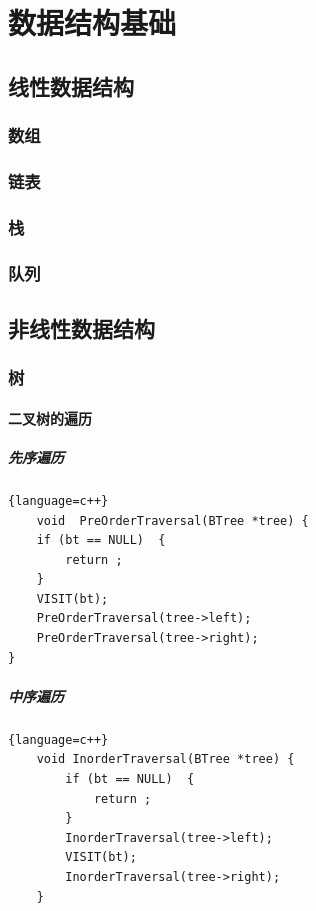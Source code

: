 \chapter{数据结构基础}
\section{线性数据结构}
\subsection{数组}
\subsection{链表}
\subsection{栈}
\subsection{队列}
\section{非线性数据结构}
\subsection{树}
\subsubsection{二叉树的遍历}
\paragraph{先序遍历}
\begin{lstlisting}{language=c++}
	void  PreOrderTraversal(BTree *tree) {
	if (bt == NULL)  {
		return ; 
	}
	VISIT(bt);
	PreOrderTraversal(tree->left); 
	PreOrderTraversal(tree->right); 
}

\end{lstlisting}
\paragraph{中序遍历}
\begin{lstlisting}{language=c++}
	void InorderTraversal(BTree *tree) {
		if (bt == NULL)  {
			return ; 
		}
		InorderTraversal(tree->left); 
		VISIT(bt);
		InorderTraversal(tree->right); 
	}
\end{lstlisting}


